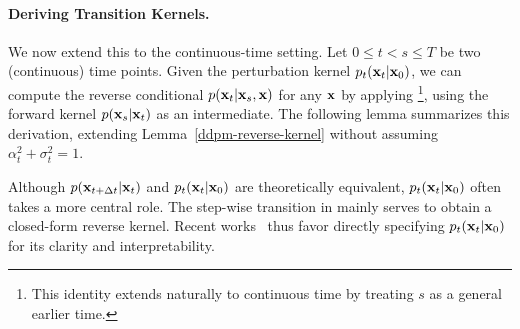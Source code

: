 \paragraph{Deriving Transition Kernels.}
We now extend this to the continuous-time setting. Let $0 \leq t < s \leq T$ be two (continuous) time points. Given the perturbation kernel $p_t({\mathbf{x}}_t|{\mathbf{x}}_0)$, we can compute the reverse conditional $p({\mathbf{x}}_t|{\mathbf{x}}_s, {\mathbf{x}})$ for any ${\mathbf{x}}$ by applying \footnote{This identity extends naturally to continuous time by treating $s$ as a general earlier time.}, using the forward kernel $p({\mathbf{x}}_s|{\mathbf{x}}_t)$ as an intermediate. The following lemma summarizes this derivation, extending Lemma~\ref{ddpm-reverse-kernel} without assuming $\alpha_t^2 + \sigma_t^2 = 1$.



Although $p({\mathbf{x}}_{t + \Delta t}|{\mathbf{x}}_t)$ and $p_t({\mathbf{x}}_t|{\mathbf{x}}_0)$ are theoretically equivalent, $p_t({\mathbf{x}}_t|{\mathbf{x}}_0)$ often takes a more central role. The step-wise transition in  mainly serves to obtain a closed-form reverse kernel. Recent works~\citep{kingma2021variational} thus favor directly specifying $p_t({\mathbf{x}}_t|{\mathbf{x}}_0)$ for its clarity and interpretability.



